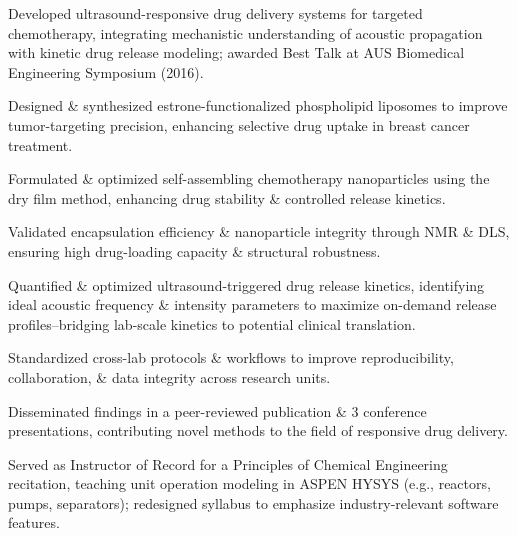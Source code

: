 \begin{tabitemize}
  \item Developed ultrasound-responsive drug delivery systems for targeted chemotherapy, integrating mechanistic understanding of acoustic propagation with kinetic drug release modeling; awarded Best Talk at AUS Biomedical Engineering Symposium (2016).
  \item Designed \& synthesized estrone-functionalized phospholipid liposomes to improve tumor-targeting precision, enhancing selective drug uptake in breast cancer treatment.%
  \item Formulated \& optimized self-assembling chemotherapy nanoparticles using the dry film method, enhancing drug stability \& controlled release kinetics.
  \item Validated encapsulation efficiency \& nanoparticle integrity through NMR \& DLS, ensuring high drug-loading capacity \& structural robustness.
  \item Quantified \& optimized ultrasound-triggered drug release kinetics, identifying ideal acoustic frequency \& intensity parameters to maximize on-demand release profiles--bridging lab-scale kinetics to potential clinical translation.
  \item Standardized cross-lab protocols \& workflows to improve reproducibility, collaboration, \& data integrity across research units.
  \item Disseminated findings in a peer-reviewed publication \& 3 conference presentations, contributing novel methods to the field of responsive drug delivery.
  \item Served as Instructor of Record for a Principles of Chemical Engineering recitation, teaching unit operation modeling in ASPEN HYSYS (e.g., reactors, pumps, separators); redesigned syllabus to emphasize industry-relevant software features.
\end{tabitemize}
\vspace{-1.6\baselineskip}
